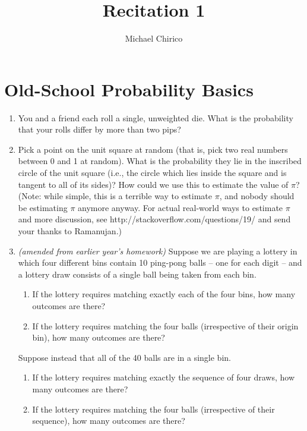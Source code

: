 \documentclass{article}
\begin{document}
\title{Recitation 1}
\author{Michael Chirico}

\maketitle

\section{Old-School Probability Basics}

\begin{enumerate}
\item You and a friend each roll a single, unweighted die. What is the probability that your rolls differ by more than two pips?
\item Pick a point on the unit square at random (that is, pick two real numbers between 0 and 1 at random). What is the probability they lie in the inscribed circle of the unit square (i.e., the circle which lies inside the square and is tangent to all of its sides)? How could we use this to estimate the value of $\pi$? (Note: while simple, this is a terrible way to estimate $\pi$, and nobody should be estimating $\pi$ anymore anyway. For actual real-world ways to estimate $\pi$ and more discussion, see http://stackoverflow.com/questions/19/ and send your thanks to Ramanujan.)
\item \textit{(amended from earlier year's homework)} Suppose we are playing a lottery in which four different bins contain 10 ping-pong balls -- one for each digit -- and a lottery draw consists of a single ball being taken from each bin.
\begin{enumerate}
\item If the lottery requires matching exactly each of the four bins, how many outcomes are there?
\item If the lottery requires matching the four balls (irrespective of their origin bin), how many outcomes are there?
\end{enumerate}
Suppose instead that all of the 40 balls are in a single bin.
\begin{enumerate}
\item If the lottery requires matching exactly the sequence of four draws, how many outcomes are there?
\item If the lottery requires matching the four balls (irrespective of their sequence), how many outcomes are there?
\end{enumerate}
\end{enumerate}
\end{document}
